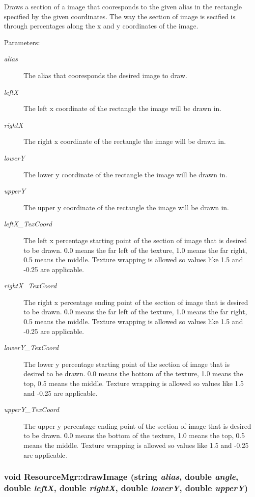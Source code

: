 Draws a section of a image that cooresponds to the given alias in the rectangle specified by the given coordinates. The way the section of image is secified is through percentages along the x and y coordinates of the image. \begin{Desc}
\item[Parameters:]
\begin{description}
\item[{\em alias}]The alias that cooresponds the desired image to draw. \item[{\em leftX}]The left x coordinate of the rectangle the image will be drawn in. \item[{\em rightX}]The right x coordinate of the rectangle the image will be drawn in. \item[{\em lowerY}]The lower y coordinate of the rectangle the image will be drawn in. \item[{\em upperY}]The upper y coordinate of the rectangle the image will be drawn in. \item[{\em leftX\_\-TexCoord}]The left x percentage starting point of the section of image that is desired to be drawn. 0.0 means the far left of the texture, 1.0 means the far right, 0.5 means the middle. Texture wrapping is allowed so values like 1.5 and -0.25 are applicable. \item[{\em rightX\_\-TexCoord}]The right x percentage ending point of the section of image that is desired to be drawn. 0.0 means the far left of the texture, 1.0 means the far right, 0.5 means the middle. Texture wrapping is allowed so values like 1.5 and -0.25 are applicable. \item[{\em lowerY\_\-TexCoord}]The lower y percentage starting point of the section of image that is desired to be drawn. 0.0 means the bottom of the texture, 1.0 means the top, 0.5 means the middle. Texture wrapping is allowed so values like 1.5 and -0.25 are applicable. \item[{\em upperY\_\-TexCoord}]The upper y percentage ending point of the section of image that is desired to be drawn. 0.0 means the bottom of the texture, 1.0 means the top, 0.5 means the middle. Texture wrapping is allowed so values like 1.5 and -0.25 are applicable. \end{description}
\end{Desc}
\hypertarget{class_resource_mgr_69cd8853048f2a2b3828e3a10b34812e}{
\subsubsection[{drawImage}]{\setlength{\rightskip}{0pt plus 5cm}void ResourceMgr::drawImage (string {\em alias}, \/  double {\em angle}, \/  double {\em leftX}, \/  double {\em rightX}, \/  double {\em lowerY}, \/  double {\em upperY})}}
\label{class_resource_mgr_69cd8853048f2a2b3828e3a10b34812e}


